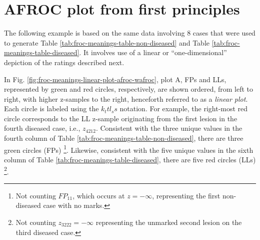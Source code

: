 \documentclass[
]{book}
\begin{document}
\hypertarget{froc-meanings-AFROC-plot-first-principles}{%
\section{AFROC plot from first principles}\label{froc-meanings-AFROC-plot-first-principles}}

The following example is based on the same data involving 8 cases that were used to generate Table \ref{tab:froc-meanings-table-non-diseased} and Table \ref{tab:froc-meanings-table-diseased}. It involves use of a linear or ``one-dimensional'' depiction of the ratings described next.

In Fig. \ref{fig:froc-meanings-linear-plot-afroc-wafroc}, plot A, FPs and LLs, represented by green and red circles, respectively, are shown ordered, from left to right, with higher z-samples to the right, henceforth referred to as a \emph{linear plot}. Each circle is labeled using the \(k_t t l_s s\) notation. For example, the right-most red circle corresponds to the LL z-sample originating from the first lesion in the fourth diseased case, i.e., \(z_{4212}\). Consistent with the three unique values in the fourth column of Table \ref{tab:froc-meanings-table-non-diseased}, there are three green circles (FPs) \footnote{Not counting \(FP_{11}\), which occurs at \(z = -\infty\), representing the first non-diseased case with no marks.}. Likewise, consistent with the five unique values in the sixth column of Table \ref{tab:froc-meanings-table-diseased}, there are five red circles (LLs) \footnote{Not counting \(z_{3222} = -\infty\) representing the unmarked second lesion on the third diseased case.}.
\end{document}
